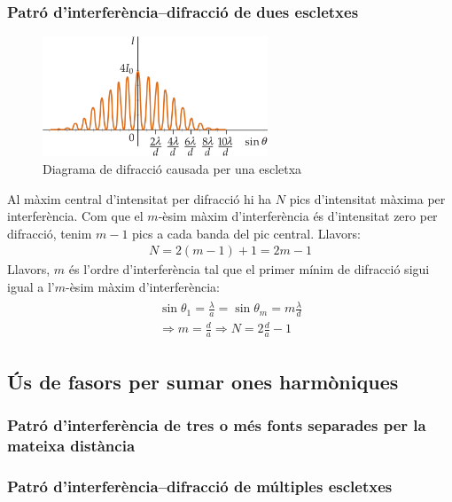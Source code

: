 \subsubsection*{Patró d'interferència--difracció de dues escletxes}
\begin{figure}[H]
\centering
    \includegraphics[width=0.6\textwidth]{images/6/65-int-dif-doble.png}
\caption{Diagrama de difracció causada per una escletxa}
\end{figure}
Al màxim central d'intensitat per difracció hi ha $N$ pics d'intensitat màxima per interferència. Com que el $m$-èsim màxim d'interferència és d'intensitat zero per difracció, tenim $m-1$ pics a cada banda del pic central. Llavors:
\begin{align}
    \boxed{N = 2(m-1) + 1 = 2m - 1}
\end{align}
Llavors, $m$ és l'ordre d'interferència tal que el primer mínim de difracció sigui igual a l'$m$-èsim màxim d'interferència:
\begin{align}
\begin{gathered}
    \sin \theta_{1} = \frac{\lambda}{a} = \sin \theta_{m} = m \frac{\lambda}{d}\\
    \Rightarrow \boxed{m = \frac{d}{a}} \Rightarrow \boxed{N = 2 \frac{d}{a} - 1}    
\end{gathered}
\end{align}

\subsection{Ús de fasors per sumar ones harmòniques}
\subsubsection*{Patró d'interferència de tres o més fonts separades per la mateixa distància}
\subsubsection*{Patró d'interferència--difracció de múltiples escletxes}
